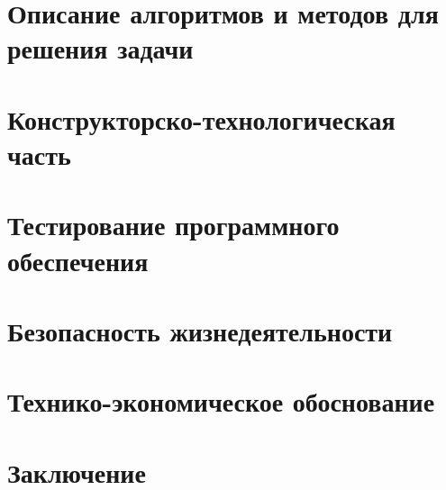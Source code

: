 





\newpage
{}
\renewcommand\contentsname{\hfill Содержание \hfill}
\tableofcontents

\newpage
\section{Описание алгоритмов и методов для решения задачи}

\newpage
\section{Конструкторско-технологическая часть}

\newpage
\section{Тестирование программного обеспечения}

\newpage
\section{Безопасность жизнедеятельности}

\newpage
\section{Технико-экономическое обоснование}

\newpage
\section{Заключение}

\newpage
\renewcommand{\refname}{Список использованных источников}

\label{form_qml}

\label{doxygen}



